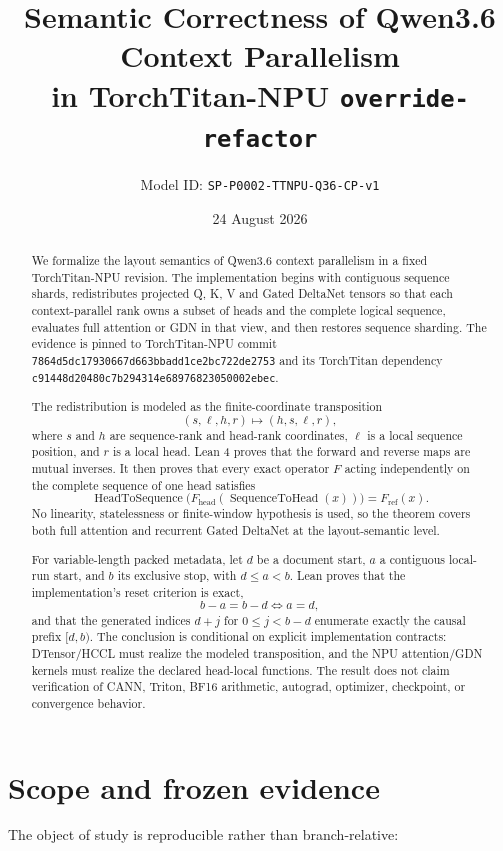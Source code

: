 \documentclass[11pt,a4paper]{article}
\title{Semantic Correctness of Qwen3.6 Context Parallelism\\in TorchTitan-NPU \texttt{override-refactor}}
\author{Model ID: \texttt{SP-P0002-TTNPU-Q36-CP-v1}}
\date{24 August 2026}
\newcommand{\SeqToHead}{\operatorname{SequenceToHead}}
\newcommand{\HeadToSeq}{\operatorname{HeadToSequence}}
\begin{document}
\maketitle

\begin{abstract}
We formalize the layout semantics of Qwen3.6 context parallelism in a fixed TorchTitan-NPU revision. The implementation begins with contiguous sequence shards, redistributes projected Q, K, V and Gated DeltaNet tensors so that each context-parallel rank owns a subset of heads and the complete logical sequence, evaluates full attention or GDN in that view, and then restores sequence sharding. The evidence is pinned to TorchTitan-NPU commit \texttt{7864d5dc17930667d663bbadd1ce2bc722de2753} and its TorchTitan dependency \texttt{c91448d20480c7b294314e68976823050002ebec}.

The redistribution is modeled as the finite-coordinate transposition
\[
(s,\ell,h,r)\longmapsto(h,s,\ell,r),
\]
where $s$ and $h$ are sequence-rank and head-rank coordinates, $\ell$ is a local sequence position, and $r$ is a local head. Lean 4 proves that the forward and reverse maps are mutual inverses. It then proves that every exact operator $F$ acting independently on the complete sequence of one head satisfies
\[
\HeadToSeq\bigl(F_{\mathrm{head}}(\SeqToHead(x))\bigr)=F_{\mathrm{ref}}(x).
\]
No linearity, statelessness or finite-window hypothesis is used, so the theorem covers both full attention and recurrent Gated DeltaNet at the layout-semantic level.

For variable-length packed metadata, let $d$ be a document start, $a$ a contiguous local-run start, and $b$ its exclusive stop, with $d\le a<b$. Lean proves that the implementation's reset criterion is exact,
\[
b-a=b-d\iff a=d,
\]
and that the generated indices $d+j$ for $0\le j<b-d$ enumerate exactly the causal prefix $[d,b)$. The conclusion is conditional on explicit implementation contracts: DTensor/HCCL must realize the modeled transposition, and the NPU attention/GDN kernels must realize the declared head-local functions. The result does not claim verification of CANN, Triton, BF16 arithmetic, autograd, optimizer, checkpoint, or convergence behavior.
\end{abstract}

\section{Scope and frozen evidence}

The object of study is reproducible rather than branch-relative:
\end{document}
